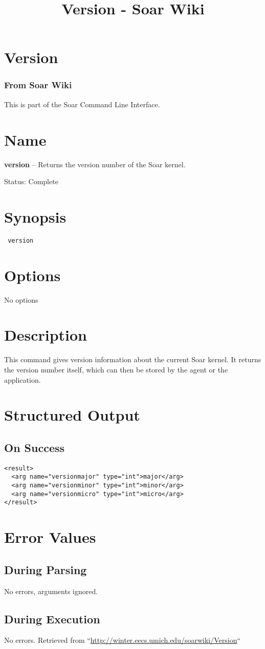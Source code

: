 \documentclass[10pt]{article}
\title{Version - Soar Wiki}
\begin{document}
\section*{Version}
\subsubsection*{From Soar Wiki}


 This is part of the Soar Command Line Interface. 
\section*{ Name }


 \textbf{version}
 -- Returns the version number of the Soar kernel. 


 Status: Complete
\section*{ Synopsis }
\begin{verbatim}
 version

\end{verbatim}
\section*{ Options }


 No options 
\section*{ Description }


 This command gives version information about the current Soar kernel. It returns the version number itself, which can then be stored by the agent or the application. 
\section*{ Structured Output }
\subsection*{ On Success }
\begin{verbatim}
<result>
  <arg name="versionmajor" type="int">major</arg>
  <arg name="versionminor" type="int">minor</arg>
  <arg name="versionmicro" type="int">micro</arg>
</result>

\end{verbatim}
\section*{ Error Values }
\subsection*{ During Parsing }


 No errors, arguments ignored. 
\subsection*{ During Execution }


 No errors.  Retrieved from ``\url{http://winter.eecs.umich.edu/soarwiki/Version}``
\end{document}
